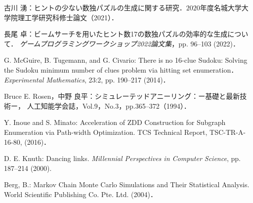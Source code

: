 \documentclass[a4paper, 9pt]{jarticle}
\begin{document}
\begin{論文概要}
\begin{thebibliography}{10}

  古川 湧：ヒントの少ない数独パズルの生成に関する研究．$2020$年度名城大学大学院理工学研究科修士論文（2021）．
  
  長尾 卓：ビームサーチを用いたヒント数17の数独パズルの効率的な生成について．
  {\it ゲームプログラミングワークショップ2022論文集}，pp. 96--103 (2022)．
  
  G. McGuire, B. Tugemann, and G. Civario:
  There is no 16-clue Sudoku: Solving the Sudoku minimum number of clues problem via hitting set enumeration．
  {\it Experimental Mathematics}, 23:2, pp. 190--217 (2014)．

  Bruce E. Rosen，中野 良平：シミュレーテッドアニーリング：ー基礎と最新技術ー，
  人工知能学会誌，Vol.9，No.3，pp.365--372（1994）．
  
  Y. Inoue and S. Minato: Acceleration of ZDD Construction for Subgraph 
  Enumeration via Path-width Optimization. TCS Technical Report, 
  TSC-TR-A-16-80, (2016)．

  D. E. Knuth: Dancing links. 
  {\it Millennial Perspectives in Computer Science}, pp. 187--214 (2000).

  Berg, B.: Markov Chain Monte Carlo Simulations and Their Statistical
  Analysis. World Scientific Publishing Co. Pte. Ltd. (2004)．
  
\end{thebibliography}

\end{論文概要} %
\end{document}
